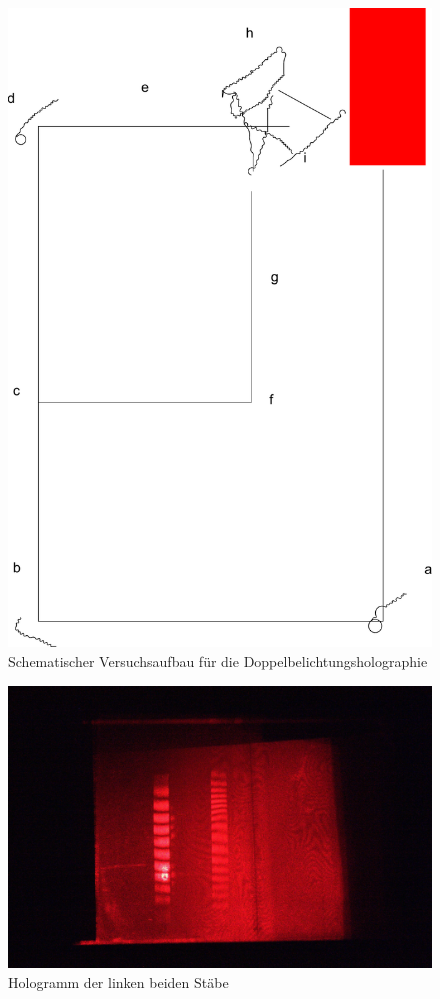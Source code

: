 \begin{figure}[ht]
 \includegraphics[height=0.5\textheight]{BilderAufbau/doppelbelichtung.pdf}
 \caption{Schematischer Versuchsaufbau für die Doppelbelichtungsholographie}
 \label{doppelbelichtung-aufbau}
\end{figure}


\begin{figure}[ht]
 \includegraphics[width=\textwidth]{Photos/IMG_3909.jpg}
 \caption{Hologramm der linken beiden Stäbe}
 \label{doppelbelichtung-links}
\end{figure}


